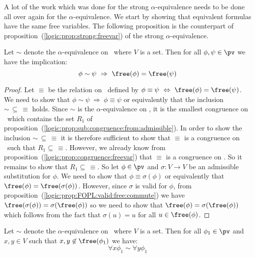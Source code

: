 A lot of the work which was done for the strong $\alpha$-equivalence
needs to be done all over again for the $\alpha$-equivalence. 
We start by showing that equivalent formulas have the
same free variables. The following proposition is the counterpart of
proposition~(\ref{logic:prop:strong:freevar}) of the strong 
$\alpha$-equivalence.

\begin{prop}\label{logic:prop:sub:congruence:freevar}
Let $\sim$ denote the $\alpha$-equivalence on \pv\ where $V$ is a
set. Then for all $\phi,\psi\in\pv$ we have the implication:
    \[
    \phi\sim\psi\ \Rightarrow\ \free(\phi)=\free(\psi)
    \]
\end{prop}

\noindent
\begin{proof}
Let $\equiv$ be the relation on \pv\ defined by $\phi\equiv\psi\
\Leftrightarrow\ \free(\phi)=\free(\psi)$. We need to show that
$\phi\sim\psi\ \Rightarrow\ \phi\equiv\psi$ or equivalently that the
inclusion $\sim\,\subseteq\,\equiv$ holds. Since $\sim$ is the
$\alpha$-equivalence on \pv, it is the smallest congruence on
\pv\ which contains the set $R_{1}$ of
proposition~(\ref{logic:prop:sub:congruence:from:admissible}). In
order to show the inclusion $\sim\,\subseteq\,\equiv$ it is
therefore sufficient to show that $\equiv$ is a congruence on \pv\
such that $R_{1}\subseteq\,\equiv$. However, we already know from
proposition~(\ref{logic:prop:congruence:freevar}) that $\equiv$ is a
congruence on \pv. So it remains to show that
$R_{1}\subseteq\,\equiv$. So let $\phi\in\pv$ and $\sigma:V\to V$ be
an admissible substitution for $\phi$. We need to show that
$\phi\equiv\sigma(\phi)$ or equivalently that
$\free(\phi)=\free(\sigma(\phi))$. However, since $\sigma$ is valid
for $\phi$, from
proposition~(\ref{logic:prop:FOPL:valid:free:commute}) we have
$\free(\sigma(\phi))=\sigma(\free(\phi))$ so we need to show that
$\free(\phi)=\sigma(\free(\phi))$ which follows from the fact that
$\sigma(u)=u$ for all $u\in\free(\phi)$.
\end{proof}

\begin{prop}\label{logic:prop:FOPL:freesubcong:xy:not:free}
Let $\sim$ denote the $\alpha$-equivalence on \pv\ where $V$ is a
set. Then for all $\phi_{1}\in\pv$ and $x,y\in V$ such that
$x,y\not\in\free(\phi_{1})$ we have:
    \[
    \forall x\phi_{1}\sim\forall y\phi_{1}
    \]
\end{prop}

